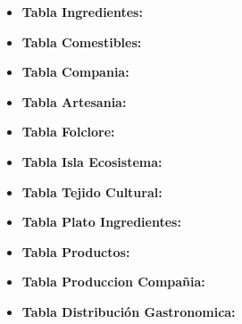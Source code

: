 \documentclass[11pt]{report}
\begin{document}
\begin{itemize}
      \item \textbf{Tabla Ingredientes:}
            \lstset{style=mystyle}
            

      \item \textbf{Tabla Comestibles:}
            \lstset{style=mystyle}
            

      \item \textbf{Tabla Compania:}
            \lstset{style=mystyle}
            

      \item \textbf{Tabla Artesania:}
            \lstset{style=mystyle}
            

      \item \textbf{Tabla Folclore:}
            \lstset{style=mystyle}
            

            \newpage

      \item \textbf{Tabla Isla Ecosistema:}
            \lstset{style=mystyle}
            

      \item \textbf{Tabla Tejido Cultural:}
            \lstset{style=mystyle}
            

      \item \textbf{Tabla Plato Ingredientes:}
            \lstset{style=mystyle}
            

      \item \textbf{Tabla Productos:}
            \lstset{style=mystyle}
            

      \item \textbf{Tabla Produccion Compañia:}
            \lstset{style=mystyle}
            

      \item \textbf{Tabla Distribución Gastronomica:}
            \lstset{style=mystyle}
            
\end{itemize}
\end{document}
